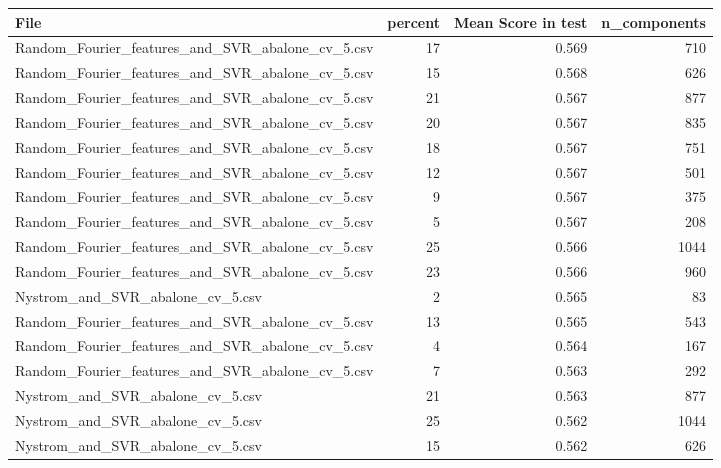 \begin{tabularx}{\textwidth}{lrrr}
\toprule
                                            File &  percent &  Mean Score in test &  n\_components \\
\midrule
Random\_Fourier\_features\_and\_SVR\_abalone\_cv\_5.csv &       17 &               0.569 &           710 \\
Random\_Fourier\_features\_and\_SVR\_abalone\_cv\_5.csv &       15 &               0.568 &           626 \\
Random\_Fourier\_features\_and\_SVR\_abalone\_cv\_5.csv &       21 &               0.567 &           877 \\
Random\_Fourier\_features\_and\_SVR\_abalone\_cv\_5.csv &       20 &               0.567 &           835 \\
Random\_Fourier\_features\_and\_SVR\_abalone\_cv\_5.csv &       18 &               0.567 &           751 \\
Random\_Fourier\_features\_and\_SVR\_abalone\_cv\_5.csv &       12 &               0.567 &           501 \\
Random\_Fourier\_features\_and\_SVR\_abalone\_cv\_5.csv &        9 &               0.567 &           375 \\
Random\_Fourier\_features\_and\_SVR\_abalone\_cv\_5.csv &        5 &               0.567 &           208 \\
Random\_Fourier\_features\_and\_SVR\_abalone\_cv\_5.csv &       25 &               0.566 &          1044 \\
Random\_Fourier\_features\_and\_SVR\_abalone\_cv\_5.csv &       23 &               0.566 &           960 \\
                Nystrom\_and\_SVR\_abalone\_cv\_5.csv &        2 &               0.565 &            83 \\
Random\_Fourier\_features\_and\_SVR\_abalone\_cv\_5.csv &       13 &               0.565 &           543 \\
Random\_Fourier\_features\_and\_SVR\_abalone\_cv\_5.csv &        4 &               0.564 &           167 \\
Random\_Fourier\_features\_and\_SVR\_abalone\_cv\_5.csv &        7 &               0.563 &           292 \\
                Nystrom\_and\_SVR\_abalone\_cv\_5.csv &       21 &               0.563 &           877 \\
                Nystrom\_and\_SVR\_abalone\_cv\_5.csv &       25 &               0.562 &          1044 \\
                Nystrom\_and\_SVR\_abalone\_cv\_5.csv &       15 &               0.562 &           626 \\

\end{tabularx}

